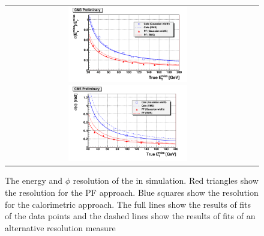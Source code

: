 \begin{figure}[tbh!]
	\centering
	\begin{tabular}{cc}
		\includegraphics[width=0.50\textwidth]{objreconstruction/pics/true_met-a.png}
		\includegraphics[width=0.50\textwidth]{objreconstruction/pics/true_met-b.png} 		
	\end{tabular}
	\caption{The energy and \ensuremath{\phi} resolution of the \met in simulation. Red triangles show the resolution for the PF approach. Blue squares show the resolution for the calorimetric approach. The full lines show the results of fits of the data points and the dashed lines show the results of fits of an alternative resolution measure \cite{CMS:2009nxa}}
	\label{fig:true_met}
\end{figure}

\clearpage